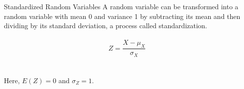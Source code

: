 \documentclass{./../div_teaching_slides}
\begin{document}
\begin{frame}{Standardized Random Variables}
A random variable can be transformed into a random variable with mean 0 and variance 1 by subtracting its mean and then dividing by its standard deviation, a process called standardization. \\~\\
$$ Z = \frac{X-\mu_X}{\sigma_X} $$ \\~\\
Here, $E(Z) = 0$ and $\sigma_Z = 1$.
\end{frame}
\end{document}
